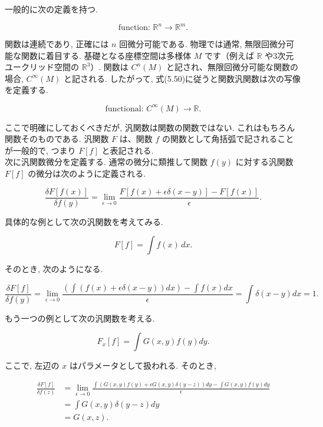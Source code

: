 \documentclass[a4paper,12pt]{article}
\begin{document}
一般的に次の定義を持つ.

\begin{equation*}
\text{function: } \mathbb{R}^n \rightarrow \mathbb{R}^m. \tag{5.53}
\end{equation*}

関数は連続であり, 正確には $ n $ 回微分可能である. 物理では通常, 無限回微分可能な関数に着目する. 基礎となる座標空間は多様体 $ M $ です（例えば $ \mathbb{R} $ や3次元ユークリッド空間の $ \mathbb{R}^3 $）. 関数は $ C^n(M) $ と記され、無限回微分可能な関数の場合, $ C^\infty(M) $ と記される. したがって, 式(5.50)に従うと関数汎関数は次の写像を定義する.

\begin{equation*}
\text{functional: } C^\infty(M) \rightarrow \mathbb{R}. \tag{5.54}
\end{equation*}

ここで明確にしておくべきだが, 汎関数は関数の関数ではない. これはもちろん関数そのものである. 汎関数 $ F $ は、関数 $ f $ の関数として角括弧で記されることが一般的で, つまり $ F[f] $ と表記される.\\

次に汎関数微分を定義する. 通常の微分に類推して関数 $ f(y) $ に対する汎関数 $ F[f] $ の微分は次のように定義される.

\begin{equation*}
\frac{\delta F[f(x)]}{\delta f(y)} = \lim_{\epsilon \to 0} \frac{F[f(x) + \epsilon \delta(x - y)] - F[f(x)]}{\epsilon}. \tag{5.55}
\end{equation*}

具体的な例として次の汎関数を考えてみる.

\begin{equation*}
F[f] = \int f(x) \, dx. \tag{5.56}
\end{equation*}

そのとき, 次のようになる.

\begin{equation*}
\frac{\delta F[f]}{\delta f(y)} = \lim_{\epsilon \to 0} \frac{\left( \int \left( f(x) + \epsilon \delta(x - y) \right) dx \right) - \int f(x) dx}{\epsilon}
= \int \delta(x - y) dx = 1. \tag{5.57}
\end{equation*}

もう一つの例として次の汎関数を考える.

\begin{equation*}
F_x[f] = \int G(x, y) f(y) dy. \tag{5.58}
\end{equation*}

ここで, 左辺の $ x $ はパラメータとして扱われる. そのとき,

\begin{align*}
\frac{\delta F[f]}{\delta f(z)} 
&= \lim_{\epsilon \to 0} \frac{\int \left( G(x, y) f(y) + \epsilon G(x, y) \delta(y - z) \right) dy - \int G(x, y) f(y) dy}{\epsilon} \\
&= \int G(x, y) \delta(y - z) dy \\
&= G(x, z). \tag{5.59}
\end{align*}
\end{document}
